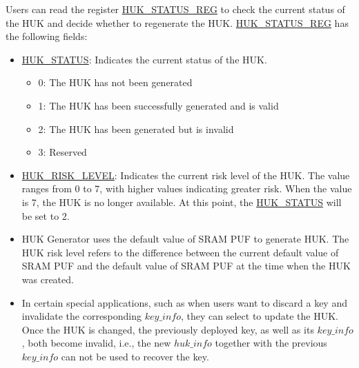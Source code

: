 \documentclass[main\_\_EN.tex]{subfiles}
\begin{document}
Users can read the register \hyperref[regdesc:HUKSTATUSREG]{HUK\_STATUS\_REG} to check the current status of the HUK and decide whether to regenerate the HUK. \hyperref[regdesc:HUKSTATUSREG]{HUK\_STATUS\_REG} has the following fields:
\begin{itemize}
    \item \hyperref[fielddesc:HUKSTATUS]{HUK\_STATUS}: Indicates the current status of the HUK.
    \begin{itemize}
        \item 0: The HUK has not been generated
        \item 1: The HUK has been successfully generated and is valid
        \item 2: The HUK has been generated but is invalid
        \item 3: Reserved
    \end{itemize}
    \item \hyperref[fielddesc:HUKRISKLEVEL]{HUK\_RISK\_LEVEL}: Indicates the current risk level of the HUK. The value ranges from 0 to 7, with higher values indicating greater risk. When the value is 7, the HUK is no longer available. At this point, the \hyperref[fielddesc:HUKSTATUS]{HUK\_STATUS} will be set to 2.
\end{itemize}

\vspace{-0.5em}
\begin{tiplisting}
\vspace{-2em}
\begin{itemize}
    \item HUK Generator uses the default value of SRAM PUF to generate HUK. The HUK risk level refers to the difference between the current default value of SRAM PUF and the default value of SRAM PUF at the time when the HUK was created.
    \item In certain special applications, such as when users want to discard a key and invalidate the corresponding \hyperref[para:keyinfo]{\begin{math}key\_info\end{math}}, they can select to update the HUK. Once the HUK is changed, the previously deployed key, as well as its \hyperref[para:keyinfo]{\begin{math}key\_info\end{math}}, both become invalid, i.e., the new \hyperref[para:hukinfo]{\begin{math}huk\_info\end{math}} together with the previous \hyperref[para:keyinfo]{\begin{math}key\_info\end{math}} can not be used to recover the key.
\end{itemize}
\end{tiplisting}
\end{document}
